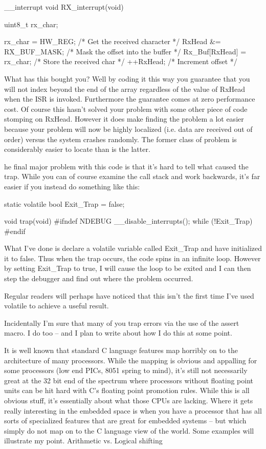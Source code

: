 {{{{{{{{{{__interrupt void RX_interrupt(void)
{
 uint8_t rx_char;

 rx_char = HW_REG;         /* Get the received character */
 RxHead &= RX_BUF_MASK;    /* Mask the offset into the buffer */
 Rx_Buf[RxHead] = rx_char; /* Store the received char */
 ++RxHead;                 /* Increment offset */
}

What has this bought you? Well by coding it this way you guarantee that you will not index beyond the end of the array regardless of the value of RxHead when the ISR is invoked. Furthermore the guarantee comes at zero performance cost. Of course this hasn’t solved your problem with some other piece of code stomping on RxHead. However it does make finding the problem a lot easier because your problem will now be highly localized (i.e. data are received out of order) versus the system crashes randomly. The former class of problem is considerably easier to locate than is the latter.

he final major problem with this code is that it’s hard to tell what caused the trap. While you can of course examine the call stack and work backwards, it’s far easier if you instead do something like this:

static volatile bool Exit_Trap = false; 

void trap(void)
{
#ifndef NDEBUG
 __disable_interrupts();
 while (!Exit_Trap)
 {
 }
#endif
}

What I’ve done is declare a volatile variable called Exit_Trap and have initialized it to false. Thus when the trap occurs, the code spins in an infinite loop. However by setting Exit_Trap to true, I will cause the loop to be exited and I can then step the debugger and find out where the problem occurred.

Regular readers will perhaps have noticed that this isn’t the first time I’ve used volatile to achieve a useful result.

Incidentally I’m sure that many of you trap errors via the use of the assert macro. I do too – and I plan to write about how I do this at some point.


It is well known that standard C language features map horribly on to the architecture of many processors. While the mapping is obvious and appalling for some processors (low end PICs, 8051 spring to mind), it’s still not necessarily great at the 32 bit end of the spectrum where processors without floating point units can be hit hard with C’s floating point promotion rules. While this is all obvious stuff, it’s essentially about what those CPUs are lacking. Where it gets really interesting in the embedded space is when you have a processor that has all sorts of specialized features that are great for embedded systems – but which simply do not map on to the C language view of the world. Some examples will illustrate my point.
Arithmetic vs. Logical shifting

}}}}}}}}}}
